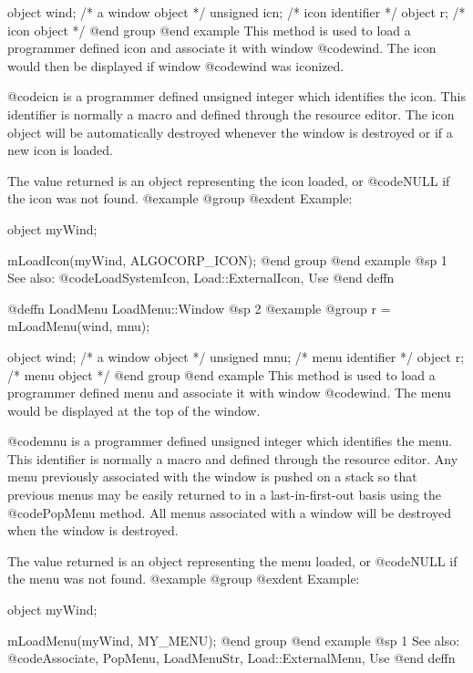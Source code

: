 object   wind;  /*  a window object  */
unsigned icn;   /*  icon identifier  */
object   r;     /*  icon object      */
@end group
@end example
This method is used to load a programmer defined icon and associate it
with window @code{wind}.  The icon would then be displayed if window
@code{wind} was iconized.

@code{icn} is a programmer defined unsigned integer which identifies
the icon.  This identifier is normally a macro and defined through the
resource editor.  The icon object will be automatically destroyed
whenever the window is destroyed or if a new icon is loaded.

The value returned is an object representing the icon loaded, or
@code{NULL} if the icon was not found.
@example
@group
@exdent Example:

object  myWind;

mLoadIcon(myWind, ALGOCORP_ICON);
@end group
@end example
@sp 1
See also:  @code{LoadSystemIcon, Load::ExternalIcon, Use}
@end deffn








@deffn {LoadMenu} LoadMenu::Window
@sp 2
@example
@group
r = mLoadMenu(wind, mnu);

object   wind;  /*  a window object  */
unsigned mnu;   /*  menu identifier  */
object   r;     /*  menu object      */
@end group
@end example
This method is used to load a programmer defined menu and associate it
with window @code{wind}.  The menu would be displayed at the top
of the window.

@code{mnu} is a programmer defined unsigned integer which identifies the
menu.  This identifier is normally a macro and defined through the
resource editor.  Any menu previously associated with the window is
pushed on a stack so that previous menus may be easily returned to in a
last-in-first-out basis using the @code{PopMenu} method.  All menus
associated with a window will be destroyed when the window is destroyed.

The value returned is an object representing the menu loaded, or
@code{NULL} if the menu was not found.
@example
@group
@exdent Example:

object  myWind;

mLoadMenu(myWind, MY_MENU);
@end group
@end example
@sp 1
See also:  @code{Associate, PopMenu, LoadMenuStr, Load::ExternalMenu, Use}
@end deffn














